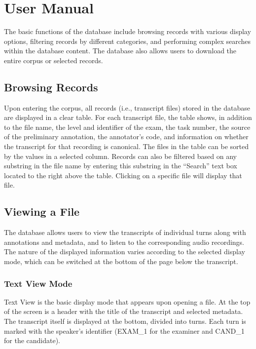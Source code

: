 \documentclass[
]{article}
\author{}
\date{}
\begin{document}
\hypertarget{user-manual}{%
\section{User Manual}\label{user-manual}}

The basic functions of the database include browsing records with
various display options, filtering records by different categories, and
performing complex searches within the database content. The database
also allows users to download the entire corpus or selected records.

\hypertarget{browsing-records}{%
\subsection{Browsing Records}\label{browsing-records}}

Upon entering the corpus, all records (i.e., transcript files) stored in
the database are displayed in a clear table. For each transcript file,
the table shows, in addition to the file name, the level and identifier
of the exam, the task number, the source of the preliminary annotation,
the annotator's code, and information on whether the transcript for that
recording is canonical. The files in the table can be sorted by the
values in a selected column. Records can also be filtered based on any
substring in the file name by entering this substring in the ``Search''
text box located to the right above the table. Clicking on a specific
file will display that file.

\hypertarget{viewing-a-file}{%
\subsection{Viewing a File}\label{viewing-a-file}}

The database allows users to view the transcripts of individual turns
along with annotations and metadata, and to listen to the corresponding
audio recordings. The nature of the displayed information varies
according to the selected display mode, which can be switched at the
bottom of the page below the transcript.

\hypertarget{text-view-mode}{%
\subsubsection{Text View Mode}\label{text-view-mode}}

Text View is the basic display mode that appears upon opening a file. At
the top of the screen is a header with the title of the transcript and
selected metadata. The transcript itself is displayed at the bottom,
divided into turns. Each turn is marked with the speaker's identifier
(EXAM\_1 for the examiner and CAND\_1 for the candidate).
\end{document}

